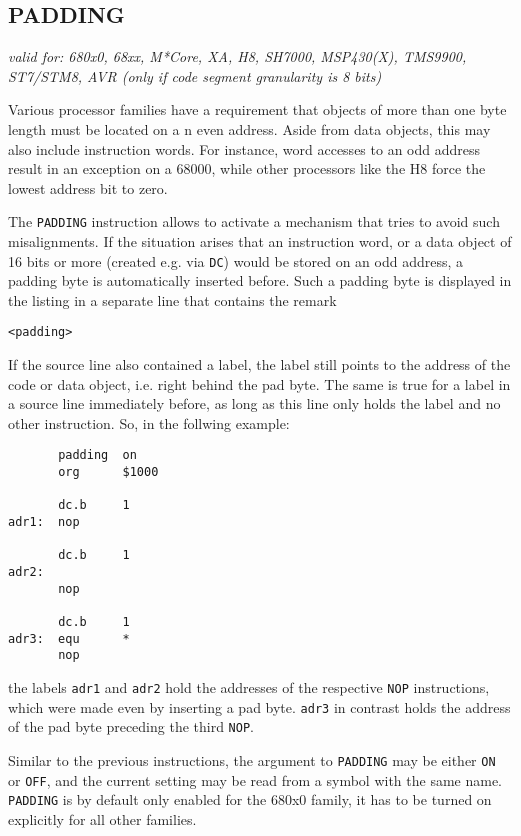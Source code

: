 \documentclass[12pt,twoside]{report}
\makeatletter
\newcommand{\tty}[1]{{\tt #1}}
\newcommand{\ttindex}[1]{\index{#1@{\tt #1}}}
\makeatother
\begin{document}

\subsection{PADDING}
\ttindex{PADDING}

{\em valid for: 680x0, 68xx, M*Core, XA, H8, SH7000, MSP430(X), TMS9900,\\
      ST7/STM8, AVR (only if code segment granularity is 8 bits)}

Various processor families have a requirement that objects of more than
one byte length must be located on a n even address.  Aside from data
objects, this may also include instruction words.  For instance, word
accesses to an odd address result in an exception on a 68000, while other
processors like the H8 force the lowest address bit to zero.

The \tty{PADDING} instruction allows to activate a mechanism that tries to
avoid such misalignments.  If the situation arises that an instruction
word, or a data object of 16 bits or more (created e.g. via \tty{DC}) would
be stored on an odd address, a padding byte is automatically inserted before.
Such a padding byte is displayed in the listing in a separate line that
contains the remark
\begin{verbatim}
<padding>
\end{verbatim}
If the source line also contained a label, the label still points to the
address of the code or data object, i.e. right behind the pad byte.  The same
is true for a label in a source line immediately before, as long as this
line {\em} only holds the label and no other instruction.  So, in the
follwing example:
\begin{verbatim}
       padding  on
       org      $1000

       dc.b     1
adr1:  nop

       dc.b     1
adr2:
       nop

       dc.b     1
adr3:  equ      *
       nop
\end{verbatim}
the labels \tty{adr1} and \tty{adr2} hold the addresses of the respective
\tty{NOP} instructions, which were made even by inserting a pad byte.
\tty{adr3} in contrast holds the address of the pad byte preceding the
third \tty{NOP}.

Similar to the previous instructions, the argument to \tty{PADDING} may be
either \tty{ON} or \tty{OFF}, and the current setting may be read from a
symbol with the same name.  \tty{PADDING} is by default only enabled for
the 680x0 family, it has to be turned on explicitly for all other families.
\end{document}
